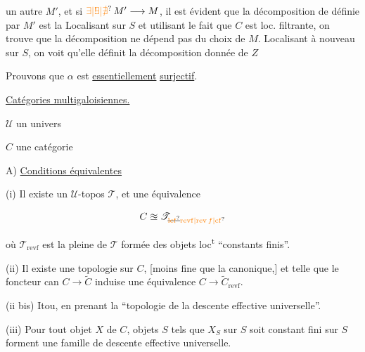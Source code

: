     


un autre $M'$, et si $\unsure{\exists|{\rlap{\text{!}}\exists}|\nexists}\,M'\longrightarrow M$,  il est évident que la décomposition de  définie par $M'$ est la  Localisant sur $S$ et utilisant le fait que $C$ est loc. filtrante, on trouve que la décomposition ne dépend pas du choix de $M$. Localisant à nouveau sur $S$, on voit qu'elle définit la décomposition donnée de $Z$

Prouvons que $\alpha$ est \uline{essentiellement} \uline{surjectif}.


\uline{Catégories multigaloisiennes.}

$\mathcal U$ un univers

$C$ une catégorie

A) \uline{Conditions équivalentes}

(i) Il existe un $\mathcal U$-topos $\mathscr T$, et une équivalence

\[
C\approxeq\mathscr T_{\deleted{\unsure{\mathrm{lcf}}}\unsure{\mathrm{revf}|\mathrm{rev}\,f|\mathrm{cf}}}
\]

où $\mathscr T_{\mathrm{revf}}$ est la  pleine de $\mathscr T$ formée des objets loc\textsuperscript{t} ``constants finis''.

(ii)  Il existe une topologie sur $C$, [moins fine que la canonique,] et telle que le foncteur can $C\longrightarrow\widetilde C$ induise une équivalence $C\longrightarrow\widetilde C_{\mathrm{revf}}$.

(ii bis) Itou, en prenant la ``topologie de la descente effective universelle''.

(iii)  Pour tout objet $X$ de $C$,  objets $S$ tels que $X_S$ sur $S$ soit constant fini sur $S$ forment une famille  de descente effective universelle.

